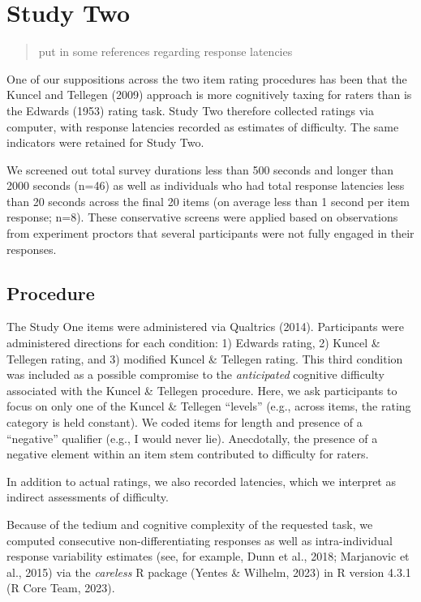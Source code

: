 \documentclass[
  ,jou]{apa6}
\begin{document}
\hypertarget{study-two}{%
\section{Study Two}\label{study-two}}

\begin{quote}
put in some references regarding response latencies
\end{quote}

One of our suppositions across the two item rating procedures has been that the Kuncel and Tellegen (2009) approach is more cognitively taxing for raters than is the Edwards (1953) rating task. Study Two therefore collected ratings via computer, with response latencies recorded as estimates of difficulty. The same indicators were retained for Study Two.

We screened out total survey durations less than 500 seconds and longer than 2000 seconds (n=46) as well as individuals who had total response latencies less than 20 seconds across the final 20 items (on average less than 1 second per item response; n=8). These conservative screens were applied based on observations from experiment proctors that several participants were not fully engaged in their responses.

\hypertarget{procedure-1}{%
\subsection{Procedure}\label{procedure-1}}

The Study One items were administered via Qualtrics (2014). Participants were administered directions for each condition: 1) Edwards rating, 2) Kuncel \& Tellegen rating, and 3) modified Kuncel \& Tellegen rating. This third condition was included as a possible compromise to the \emph{anticipated} cognitive difficulty associated with the Kuncel \& Tellegen procedure. Here, we ask participants to focus on only one of the Kuncel \& Tellegen ``levels'' (e.g., across items, the rating category is held constant). We coded items for length and presence of a ``negative'' qualifier (e.g., I would never lie). Anecdotally, the presence of a negative element within an item stem contributed to difficulty for raters.

In addition to actual ratings, we also recorded latencies, which we interpret as indirect assessments of difficulty.

Because of the tedium and cognitive complexity of the requested task, we computed consecutive non-differentiating responses as well as intra-individual response variability estimates (see, for example, Dunn et al., 2018; Marjanovic et al., 2015) via the \emph{careless} R package (Yentes \& Wilhelm, 2023) in R version 4.3.1 (R Core Team, 2023).
\end{document}
